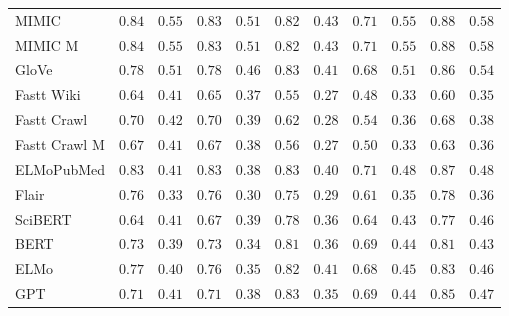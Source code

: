 \documentclass[letterpaper]{article} %
\begin{document}
\begin{table}[h]
\begin{tabular}{l l l l l l l l l l l}
MIMIC & $0.84$ & $0.55$ & $0.83$ & $0.51$ & $0.82$ & $0.43$ & $0.71$ & $0.55$ & $0.88$ & $0.58$ \\
MIMIC M & $0.84$ & $0.55$ & $0.83$ & $0.51$ & $0.82$ & $0.43$ & $0.71$ & $0.55$ & $0.88$ & $0.58$ \\
\midrule
GloVe & $0.78$ & $0.51$ & $0.78$ & $0.46$ & $0.83$ & $0.41$ & $0.68$ & $0.51$ & $0.86$ & $0.54$ \\
Fastt Wiki & $0.64$ & $0.41$ & $0.65$ & $0.37$ & $0.55$ & $0.27$ & $0.48$ & $0.33$ & $0.60$ & $0.35$ \\
Fastt Crawl & $0.70$ & $0.42$ & $0.70$ & $0.39$ & $0.62$ & $0.28$ & $0.54$ & $0.36$ & $0.68$ & $0.38$ \\
Fastt Crawl M & $0.67$ & $0.41$ & $0.67$ & $0.38$ & $0.56$ & $0.27$ & $0.50$ & $0.33$ & $0.63$ & $0.36$ \\
\midrule
ELMoPubMed & $0.83$ & $0.41$ & $0.83$ & $0.38$ & $0.83$ & $0.40$ & $0.71$ & $0.48$ & $0.87$ & $0.48$ \\
Flair & $0.76$ & $0.33$ & $0.76$ & $0.30$ & $0.75$ & $0.29$ & $0.61$ & $0.35$ & $0.78$ & $0.36$ \\
SciBERT & $0.64$ & $0.41$ & $0.67$ & $0.39$ & $0.78$ & $0.36$ & $0.64$ & $0.43$ & $0.77$ & $0.46$ \\
BERT & $0.73$ & $0.39$ & $0.73$ & $0.34$ & $0.81$ & $0.36$ & $0.69$ & $0.44$ & $0.81$ & $0.43$ \\
ELMo & $0.77$ & $0.40$ & $0.76$ & $0.35$ & $0.82$ & $0.41$ & $0.68$ & $0.45$ & $0.83$ & $0.46$ \\
GPT & $0.71$ & $0.41$ & $0.71$ & $0.38$ & $0.83$ & $0.35$ & $0.69$ & $0.44$ & $0.85$ & $0.47$ \\

\end{tabular}
\end{table}
\end{document}
